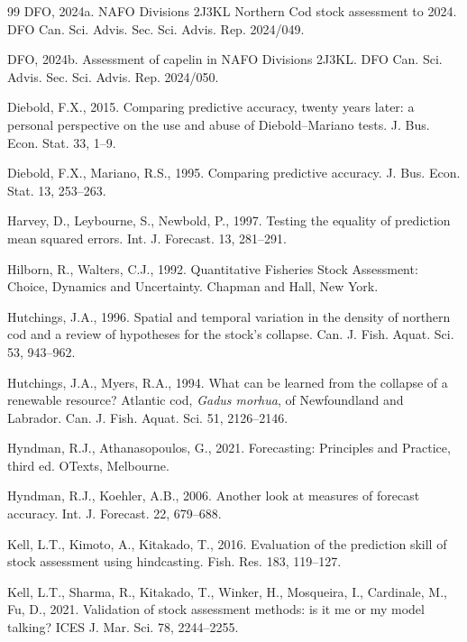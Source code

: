 \documentclass[preprint,11pt,authoryear]{elsarticle}
\theoremstyle{definition}
\theoremstyle{remark}
\begin{document}
\begin{thebibliography}{99}
DFO, 2024a. NAFO Divisions 2J3KL Northern Cod stock assessment to 2024. DFO Can. Sci. Advis. Sec. Sci. Advis. Rep. 2024/049.

DFO, 2024b. Assessment of capelin in NAFO Divisions 2J3KL. DFO Can. Sci. Advis. Sec. Sci. Advis. Rep. 2024/050.

Diebold, F.X., 2015. Comparing predictive accuracy, twenty years later: a personal perspective on the use and abuse of Diebold--Mariano tests. J. Bus. Econ. Stat. 33, 1--9.

Diebold, F.X., Mariano, R.S., 1995. Comparing predictive accuracy. J. Bus. Econ. Stat. 13, 253--263.

Harvey, D., Leybourne, S., Newbold, P., 1997. Testing the equality of prediction mean squared errors. Int. J. Forecast. 13, 281--291.

Hilborn, R., Walters, C.J., 1992. Quantitative Fisheries Stock Assessment: Choice, Dynamics and Uncertainty. Chapman and Hall, New York.

Hutchings, J.A., 1996. Spatial and temporal variation in the density of northern cod and a review of hypotheses for the stock's collapse. Can. J. Fish. Aquat. Sci. 53, 943--962.

Hutchings, J.A., Myers, R.A., 1994. What can be learned from the collapse of a renewable resource? Atlantic cod, \emph{Gadus morhua}, of Newfoundland and Labrador. Can. J. Fish. Aquat. Sci. 51, 2126--2146.

Hyndman, R.J., Athanasopoulos, G., 2021. Forecasting: Principles and Practice, third ed. OTexts, Melbourne.

Hyndman, R.J., Koehler, A.B., 2006. Another look at measures of forecast accuracy. Int. J. Forecast. 22, 679--688.

Kell, L.T., Kimoto, A., Kitakado, T., 2016. Evaluation of the prediction skill of stock assessment using hindcasting. Fish. Res. 183, 119--127.

Kell, L.T., Sharma, R., Kitakado, T., Winker, H., Mosqueira, I., Cardinale, M., Fu, D., 2021. Validation of stock assessment methods: is it me or my model talking? ICES J. Mar. Sci. 78, 2244--2255.


\end{thebibliography}
\end{document}
